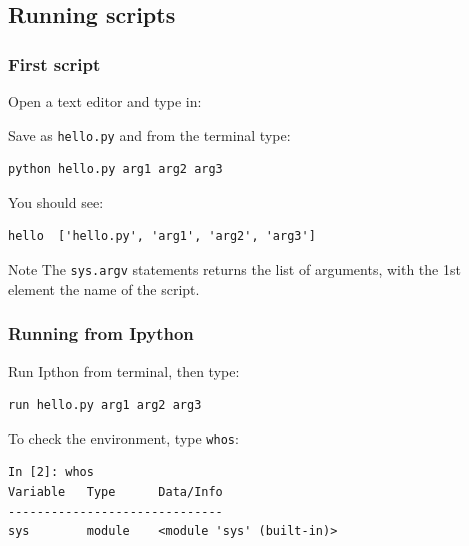 \subsection{Running scripts}

\begin{frame}[fragile]
    \frametitle{First script}
    Open a text editor and type in:
    
    \vspace{1em}

Save as \verb+hello.py+ and from the terminal type:
    \begin{lstlisting}[language=bash, basicstyle=\ttfamily\scriptsize] 
python hello.py arg1 arg2 arg3
    \end{lstlisting}
    \vspace{0.5em}

You should see:
    \vspace{-0.5em}
    \begin{verbatim}
hello  ['hello.py', 'arg1', 'arg2', 'arg3']
    \end{verbatim}
    \vspace{-1.0em}
    \begin{block}{Note}
The \verb+sys.argv+ statements returns the list of arguments, with the 1st element the name of the script.
    \end{block}
\end{frame}

\begin{frame}[fragile]
    \frametitle{Running from Ipython}
    Run Ipthon from terminal, then type:
    \begin{lstlisting}[basicstyle=\ttfamily\scriptsize]
run hello.py arg1 arg2 arg3
    \end{lstlisting}
    \vspace{1em}
    To check the environment, type \verb+whos+: 
    \begin{lstlisting}[basicstyle=\ttfamily\scriptsize]
In [2]: whos
Variable   Type      Data/Info
------------------------------
sys        module    <module 'sys' (built-in)>
    \end{lstlisting}
\end{frame}

